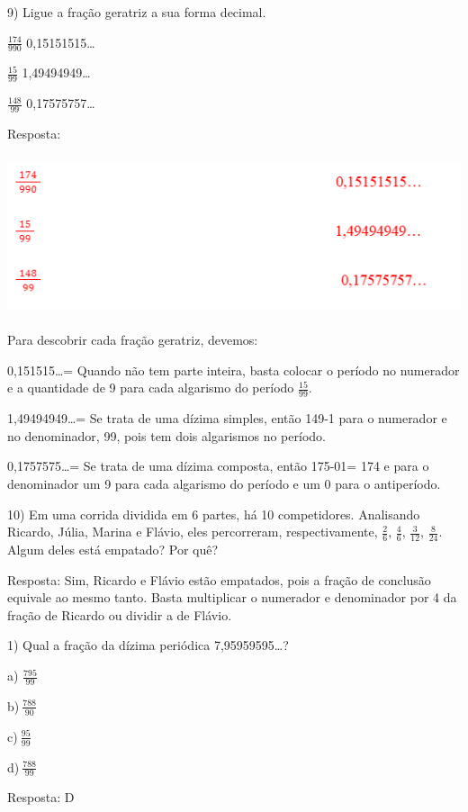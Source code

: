 {{{9) Ligue a fração geratriz a sua forma decimal.

\(\frac{174}{990}\) 0,15151515\ldots{}

\(\frac{15}{99}\) 1,49494949\ldots{}

\(\frac{148}{99}\) 0,17575757\ldots{}

Resposta:

\includegraphics[width=5.58333in,height=1.84375in]{./imgSAEB_7_MAT/media/image10.png}

Para descobrir cada fração geratriz, devemos:

0,151515\ldots= Quando não tem parte inteira, basta colocar o período no
numerador e a quantidade de 9 para cada algarismo do período
\(\frac{15}{99}\).

1,49494949\ldots= Se trata de uma dízima simples, então 149-1 para o
numerador e no denominador, 99, pois tem dois algarismos no período.

0,1757575\ldots= Se trata de uma dízima composta, então 175-01= 174 e
para o denominador um 9 para cada algarismo do período e um 0 para o
antiperíodo.

10) Em uma corrida dividida em 6 partes, há 10 competidores. Analisando
Ricardo, Júlia, Marina e Flávio, eles percorreram, respectivamente,
\(\frac{2}{6}\), \(\frac{4}{6}\), \(\frac{3}{12}\), \(\frac{8}{24}\).
Algum deles está empatado? Por quê?

Resposta: Sim, Ricardo e Flávio estão empatados, pois a fração de
conclusão equivale ao mesmo tanto. Basta multiplicar o numerador e
denominador por 4 da fração de Ricardo ou dividir a de Flávio.


1) Qual a fração da dízima periódica 7,95959595\ldots?

a) \(\frac{795}{99}\)

b)\(\ \frac{788}{90}\)

c)\(\ \frac{95}{99}\)

d)\(\ \frac{788}{99}\)

Resposta: D

}}}
